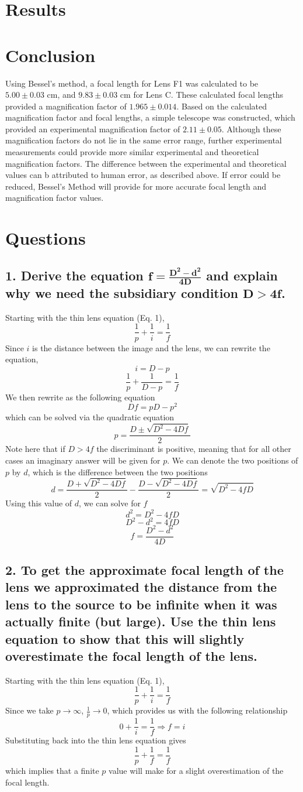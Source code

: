 \documentclass[12pt]{article}
\begin{document}
\section{Results}

\newpage
\section{Conclusion}
Using Bessel's method, a focal length for Lens F1 was calculated to be $5.00\pm0.03$ cm, and $9.83\pm0.03$ cm for Lens C. 
These calculated focal lengths provided a magnification factor of $1.965\pm0.014$. 
Based on the calculated magnification factor and focal lengths, a simple telescope was constructed, which provided an experimental magnification factor of $2.11\pm0.05$. 
Although these magnification factors do not lie in the same error range, further experimental measurements could provide more similar experimental and theoretical magnification factors.
The difference between the experimental and theoretical values can b attributed to human error, as described above. 
If error could be reduced, Bessel's Method will provide for more accurate focal length and magnification factor values.
\newpage
\section{Questions}
\subsection*{1. Derive the equation $\bm{f=\frac{D^2-d^2}{4D}}$ and explain why we need the subsidiary condition $\bm{D>4f}$.}
\noindent Starting with the thin lens equation (Eq. 1), \[\frac{1}{p}+\frac{1}{i}=\frac{1}{f}\] Since $i$ is the distance between the image and the lens, we can rewrite the equation, \[i=D-p\]\[\frac{1}{p}+\frac{1}{D-p}=\frac{1}{f}\] 
We then rewrite as the following equation \[Df=pD-p^2\] which can be solved via the quadratic equation \[p=\frac{D\pm\sqrt{D^2-4Df}}{2}\]
Note here that if $D>4f$ the discriminant is positive, meaning that for all other cases an imaginary answer will be given for $p$. We can denote the two positions of $p$ by $d$, which is the difference between the two positions
\[d=\frac{D+\sqrt{D^2-4Df}}{2}-\frac{D-\sqrt{D^2-4Df}}{2}=\sqrt{D^2-4fD}\]
Using this value of $d$, we can solve for $f$ \[d^2=D^2-4fD\]\[D^2-d^2=4fD\]
\[\boxed{f=\frac{D^2-d^2}{4D}}\]
\newpage
\subsection*{2. To get the approximate focal length of the lens we approximated the distance from the lens to the source to be infinite when it was actually finite (but large). Use the thin lens equation to show that this will slightly overestimate the focal length of the lens.}
\noindent Starting with the thin lens equation (Eq. 1), \[\frac{1}{p}+\frac{1}{i}=\frac{1}{f}\]
Since we take $p\rightarrow\infty$, $\frac{1}{p}\rightarrow0$, which provides us with the following relationship\[0+\frac{1}{i}=\frac{1}{f}\Rightarrow f=i\]
Substituting back into the thin lens equation gives \[\frac{1}{p}+\frac{1}{f}=\frac{1}{f}\] which implies that a finite $p$ value will make for a slight overestimation of the focal length.
\end{document}
